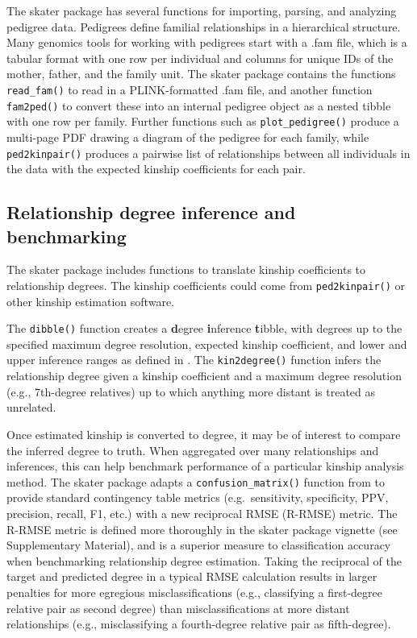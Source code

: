 \documentclass{bioinfo}
\begin{document}
The skater package has several functions for importing, parsing, and
analyzing pedigree data. Pedigrees define familial relationships in a
hierarchical structure. Many genomics tools for working with pedigrees
start with a .fam file, which is a tabular format with one row per
individual and columns for unique IDs of the mother, father, and the
family unit. The skater package contains the functions
\texttt{read\_fam()} to read in a PLINK-formatted .fam file, and another
function \texttt{fam2ped()} to convert these into an internal pedigree
object as a nested tibble with one row per family. Further functions
such as \texttt{plot\_pedigree()} produce a multi-page PDF drawing a
diagram of the pedigree for each family, while \texttt{ped2kinpair()}
produces a pairwise list of relationships between all individuals in the
data with the expected kinship coefficients for each pair.

\subsection{Relationship degree inference and benchmarking}

The skater package includes functions to translate kinship coefficients
to relationship degrees. The kinship coefficients could come from
\texttt{ped2kinpair()} or other kinship estimation software.

The \texttt{dibble()} function creates a \textbf{d}egree
\textbf{i}nference \textbf{t}ibble, with degrees up to the specified
maximum degree resolution, expected kinship coefficient, and lower and
upper inference ranges as defined in \citet{manichaikul2010}. The
\texttt{kin2degree()} function infers the relationship degree given a
kinship coefficient and a maximum degree resolution (e.g., 7th-degree
relatives) up to which anything more distant is treated as unrelated.

Once estimated kinship is converted to degree, it may be of interest to
compare the inferred degree to truth. When aggregated over many
relationships and inferences, this can help benchmark performance of a
particular kinship analysis method. The skater package adapts a
\texttt{confusion\_matrix()} function from \citet{clark2021} to provide
standard contingency table metrics (e.g.~sensitivity, specificity, PPV,
precision, recall, F1, etc.) with a new reciprocal RMSE (R-RMSE) metric.
The R-RMSE metric is defined more thoroughly in the skater package
vignette (see Supplementary Material), and is a superior measure to
classification accuracy when benchmarking relationship degree
estimation. Taking the reciprocal of the target and predicted degree in
a typical RMSE calculation results in larger penalties for more
egregious misclassifications (e.g., classifying a first-degree relative
pair as second degree) than misclassifications at more distant
relationships (e.g., misclassifying a fourth-degree relative pair as
fifth-degree).
\end{document}
